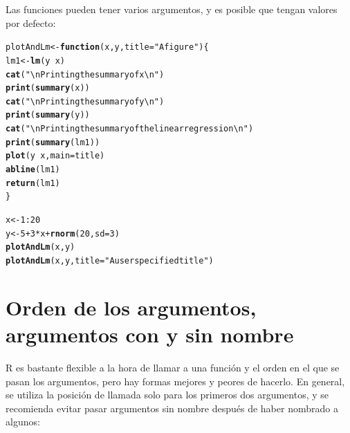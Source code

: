 \documentclass{config/apuntes}\usepackage[]{graphicx}\usepackage[]{xcolor}
\makeatletter
\newcommand{\hlnum}[1]{\textcolor[rgb]{0.686,0.059,0.569}{#1}}%
\newcommand{\hlsng}[1]{\textcolor[rgb]{0.192,0.494,0.8}{#1}}%
\newcommand{\hlopt}[1]{\textcolor[rgb]{0,0,0}{#1}}%
\newcommand{\hldef}[1]{\textcolor[rgb]{0.345,0.345,0.345}{#1}}%
\newcommand{\hlkwa}[1]{\textcolor[rgb]{0.161,0.373,0.58}{\textbf{#1}}}%
\newcommand{\hlkwb}[1]{\textcolor[rgb]{0.69,0.353,0.396}{#1}}%
\newcommand{\hlkwc}[1]{\textcolor[rgb]{0.333,0.667,0.333}{#1}}%
\newcommand{\hlkwd}[1]{\textcolor[rgb]{0.737,0.353,0.396}{\textbf{#1}}}%
\newenvironment{kframe}{%
 \def\at@end@of@kframe{}%
 \ifinner\ifhmode%
  \def\at@end@of@kframe{\end{minipage}}%
  \begin{minipage}{\columnwidth}%
 \fi\fi%
 \def\FrameCommand##1{\hskip\@totalleftmargin \hskip-\fboxsep
 \colorbox{shadecolor}{##1}\hskip-\fboxsep
     \hskip-\linewidth \hskip-\@totalleftmargin \hskip\columnwidth}%
 \MakeFramed {\advance\hsize-\width
   \@totalleftmargin\z@ \linewidth\hsize
   \@setminipage}}%
 {\par\unskip\endMakeFramed%
 \at@end@of@kframe}
\newenvironment{knitrout}{}{} %
\makeatother
\begin{document}
Las funciones pueden tener varios argumentos, y es posible que tengan valores por defecto:

\begin{knitrout}
\color{fgcolor}\begin{kframe}
\begin{alltt}
\hldef{plotAndLm} \hlkwb{<-} \hlkwa{function}\hldef{(}\hlkwc{x}\hldef{,} \hlkwc{y}\hldef{,} \hlkwc{title} \hldef{=} \hlsng{"A figure"}\hldef{) \{}
  \hldef{lm1} \hlkwb{<-} \hlkwd{lm}\hldef{(y} \hlopt{~} \hldef{x)}
  \hlkwd{cat}\hldef{(}\hlsng{"\textbackslash{}n Printing the summary of x\textbackslash{}n"}\hldef{)}
  \hlkwd{print}\hldef{(}\hlkwd{summary}\hldef{(x))}
  \hlkwd{cat}\hldef{(}\hlsng{"\textbackslash{}n Printing the summary of y\textbackslash{}n"}\hldef{)}
  \hlkwd{print}\hldef{(}\hlkwd{summary}\hldef{(y))}
  \hlkwd{cat}\hldef{(}\hlsng{"\textbackslash{}n Printing the summary of the linear regression\textbackslash{}n"}\hldef{)}
  \hlkwd{print}\hldef{(}\hlkwd{summary}\hldef{(lm1))}
  \hlkwd{plot}\hldef{(y} \hlopt{~} \hldef{x,} \hlkwc{main} \hldef{= title)}
  \hlkwd{abline}\hldef{(lm1)}
  \hlkwd{return}\hldef{(lm1)}
\hldef{\}}

\hldef{x} \hlkwb{<-} \hlnum{1}\hlopt{:}\hlnum{20}
\hldef{y} \hlkwb{<-} \hlnum{5} \hlopt{+} \hlnum{3} \hlopt{*}\hldef{x} \hlopt{+} \hlkwd{rnorm}\hldef{(}\hlnum{20}\hldef{,} \hlkwc{sd} \hldef{=} \hlnum{3}\hldef{)}
\hlkwd{plotAndLm}\hldef{(x, y)}
\hlkwd{plotAndLm}\hldef{(x, y,} \hlkwc{title} \hldef{=} \hlsng{"A user specified title"}\hldef{)}
\end{alltt}
\end{kframe}
\end{knitrout}

\section{Orden de los argumentos, argumentos con y sin nombre}
R es bastante flexible a la hora de llamar a una función y el orden en el que se pasan los argumentos, pero hay formas mejores y peores de hacerlo. En general, se utiliza la posición de llamada solo para los primeros dos argumentos, y se recomienda evitar pasar argumentos sin nombre después de haber nombrado a algunos:
\end{document}
